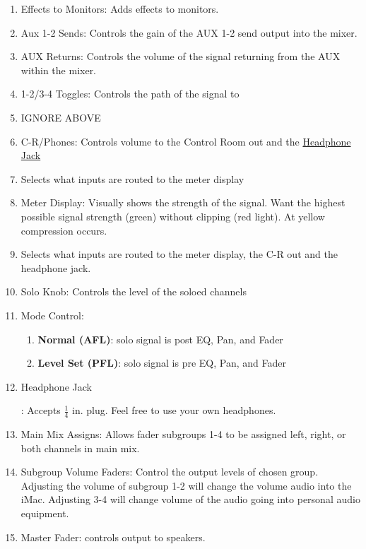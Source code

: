 \documentclass{tufte-book} %
\begin{document}
\begin{enumerate}
	\item Effects to Monitors: Adds effects to monitors. 
	\item Aux 1-2 Sends: Controls the gain of the AUX 1-2 send output into the mixer. 
	\item AUX Returns: Controls the volume of the signal returning from the AUX within the mixer. 
	\item 1-2/3-4 Toggles: Controls the path of the signal to 
	\item IGNORE ABOVE
	\item C-R/Phones: Controls volume to the Control Room out and the \hyperlink{Headphone Jack}{Headphone Jack}
	\item Selects what inputs are routed to the meter display
	\item Meter Display: Visually shows the strength of the signal. Want the highest possible signal strength (green) without clipping (red light). At yellow compression occurs.
	\item Selects what inputs are routed to the meter display, the C-R out and the headphone jack. 
	\item Solo Knob: Controls the level of the soloed channels
	\item Mode Control: 
	\begin{enumerate}
		\item \textbf{Normal (AFL)}: solo signal is post EQ, Pan, and Fader
		\item \textbf{Level Set (PFL)}: solo signal is pre EQ, Pan, and Fader
	\end{enumerate}
	\item \hypertarget{Headphone Jack}{Headphone Jack}: Accepts $\frac{1}{4}$ in. plug. Feel free to use your own headphones. 
	\item Main Mix Assigns: Allows fader subgroups 1-4 to be assigned left, right, or both channels in main mix. 
	\item Subgroup Volume Faders: Control the output levels of chosen group. Adjusting the volume of subgroup 1-2 will change the volume audio into the iMac. Adjusting 3-4 will change volume of the audio going into personal audio equipment. 
	\item Master Fader: controls output to speakers. 
\end{enumerate}








\newpage
\end{document}
